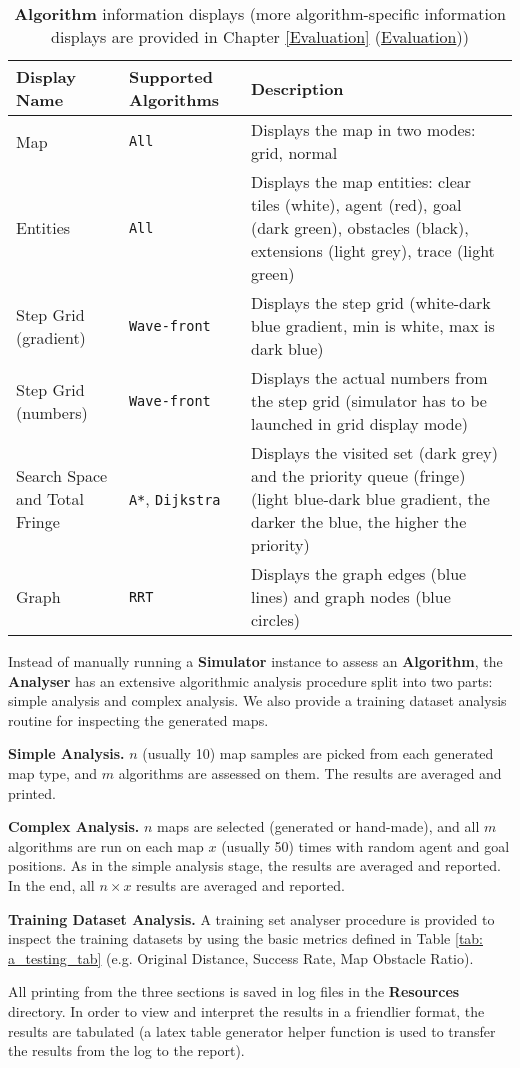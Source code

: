 \begin{table}[h!]
    \centerfloat
    \begin{tabular}{|M{2cm}|M{2.7cm}|M{9.2cm}|}
         \hline
         \textbf{Display Name} & \textbf{Supported Algorithms} & \textbf{Description} \\
         \hline
         Map & \texttt{All} & Displays the map in two modes: grid, normal \\
         \hline
         Entities & \texttt{All} & Displays the map entities: clear tiles (white), agent (red), goal (dark green), obstacles (black), extensions (light grey), trace (light green) \\
         \hline
         Step Grid (gradient) & \texttt{Wave-front} & Displays the step grid (white-dark blue gradient, min is white, max is dark blue) \\
         \hline
         Step Grid (numbers) & \texttt{Wave-front} & Displays the actual numbers from the step grid (simulator has to be launched in grid display mode) \\
         \hline
         Search Space and Total Fringe & \texttt{A*}, \texttt{Dijkstra} & Displays the visited set (dark grey) and the priority queue (fringe) (light blue-dark blue gradient, the darker the blue, the higher the priority) \\
         \hline
         Graph & \texttt{RRT} & Displays the graph edges (blue lines) and graph nodes (blue circles) \\
         \hline
    \end{tabular}
    \caption{\textbf{Algorithm} information displays (more algorithm-specific information displays are provided in Chapter \ref {Evaluation} (\hyperref[Evaluation]{Evaluation}))}
    \label{tab: map_dsiplays}
\end{table}

Instead of manually running a \textbf{Simulator} instance to assess an \textbf{Algorithm}, the \textbf{Analyser} has an extensive algorithmic analysis procedure split into two parts: simple analysis and complex analysis. We also provide a training dataset analysis routine for inspecting the generated maps.

\textbf{Simple Analysis.} $n$ (usually 10) map samples are picked from each generated map type, and $m$ algorithms are assessed on them. The results are averaged and printed.

\textbf{Complex Analysis.} $n$ maps are selected (generated or hand-made), and all $m$ algorithms are run on each map $x$ (usually 50) times with random agent and goal positions. As in the simple analysis stage, the results are averaged and reported. In the end, all $n \times x$ results are averaged and reported.

\textbf{Training Dataset Analysis.} A training set analyser procedure is provided to inspect the training datasets by using the basic metrics defined in Table \ref{tab: a_testing_tab} (e.g. Original Distance, Success Rate, Map Obstacle Ratio).

All printing from the three sections is saved in log files in the \textbf{Resources} directory. In order to view and interpret the results in a friendlier format, the results are tabulated (a latex table generator helper function is used to transfer the results from the log to the report). 
